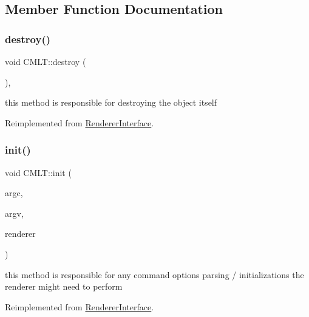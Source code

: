 \subsection{Member Function Documentation}
\mbox{\label{struct_c_m_l_t_aa8558dad2db5508be7aa028f69af7308}} 
\subsubsection{\texorpdfstring{destroy()}{destroy()}}
{\footnotesize\ttfamily void C\+M\+L\+T\+::destroy (\begin{DoxyParamCaption}{ }\end{DoxyParamCaption})\hspace{0.3cm}{\ttfamily [inline]}, {\ttfamily [virtual]}}

this method is responsible for destroying the object itself 

Reimplemented from \hyperlink{struct_renderer_interface_a7469218aafa029a3e22bac2c00dca9f5}{Renderer\+Interface}.

\mbox{\label{struct_c_m_l_t_a16f9c8c63c6027478854528963cf4ccf}} 
\subsubsection{\texorpdfstring{init()}{init()}}
{\footnotesize\ttfamily void C\+M\+L\+T\+::init (\begin{DoxyParamCaption}\item[{int}]{argc,  }\item[{char $\ast$$\ast$}]{argv,  }\item[{\hyperlink{struct_rendering_context}{Rendering\+Context} \&}]{renderer }\end{DoxyParamCaption})\hspace{0.3cm}{\ttfamily [virtual]}}

this method is responsible for any command options parsing / initializations the renderer might need to perform 

Reimplemented from \hyperlink{struct_renderer_interface_a2ead9b943d6d48fcd32872e0005ebe63}{Renderer\+Interface}.

\mbox{\label{struct_c_m_l_t_ad8fe8b00cbe99184c726849da14a5ab2}} 
